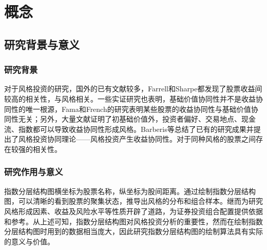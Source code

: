 \section{概念}
\subsection{研究背景与意义}

\subsubsection{研究背景}
对于风格投资的研究，国外的已有文献较多，Farrell\cite{Farrell}和Sharpe\cite{Farrell}都发现了股票收益间较高的相关性，与风格相关。一些实证研究也表明，基础价值协同性并不是收益协同性的唯一根源，Fama\cite{Farrell}和French的研究表明某些股票的收益协同性与基础价值协同性无关；另外，大量文献证明了初基础价值外，投资者偏好、交易地点、现金流、指数都可以导致收益协同性形成风格。Barberis等总结了已有的研究成果并提出了风格投资协同理论——风格投资产生收益协同性。对于同种风格的股票之间存在较强的相关性。

\subsubsection{研究作用与意义}
指数分层结构图横坐标为股票名称，纵坐标为股间距离。通过绘制指数分层结构图，可以清晰的看到股票的聚集状态，推导出风格的分布和组合样本。继而为研究风格形成因素、收益及风险水平等性质开辟了道路，为证券投资组合配置提供依据和参考。从上述可知，指数分层结构图对风格投资分析的重要性，然而在绘制指数分层结构图时用到的数据相当庞大，因此研究指数分层结构图的绘制算法具有实际的意义与价值。

